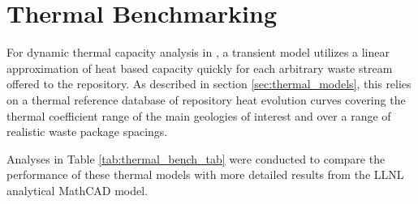 \section{Thermal Benchmarking} \label{sec:thermal_benchmarking}



For dynamic thermal capacity analysis in \Cyder, a transient model utilizes a 
linear approximation of heat based capacity quickly for each arbitrary waste 
stream offered to the repository. As described in section 
\ref{sec:thermal_models}, this relies on a thermal reference database 
of repository heat evolution curves covering the thermal coefficient range of 
the main geologies of interest and over a range of realistic waste package 
spacings. 

Analyses in Table \ref{tab:thermal_bench_tab} were conducted to compare the 
performance of these thermal models with more detailed results from the 
\gls{LLNL} analytical MathCAD model.

